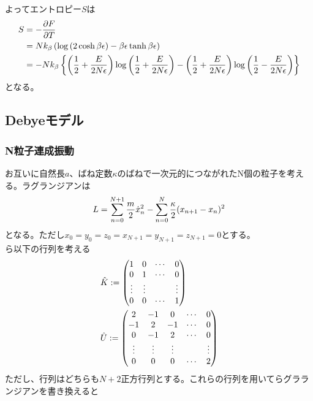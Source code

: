 \documentclass{jsarticle}  %
\numberwithin{equation}{section} %
\numberwithin{figure}{section}
\begin{document}
    よってエントロピー$S$は
    \begin{align}
        S &= -\frac{\partial F}{\partial T} \notag \\
        &= Nk_\beta \left( \log \left( 2\cosh \beta \epsilon \right) - \beta \epsilon \tanh \beta \epsilon \right) \\
        &= -Nk_\beta \left\{ \left( \frac{1}{2} + \frac{E}{2N\epsilon} \right) \log \left( \frac{1}{2} + \frac{E}{2N\epsilon} \right) - \left( \frac{1}{2} + \frac{E}{2N\epsilon} \right) \log \left( \frac{1}{2} - \frac{E}{2N\epsilon} \right) \right\} 
    \end{align}
    となる。
\subsection{Debyeモデル}
\subsubsection{N粒子連成振動}
    お互いに自然長$a$、ばね定数$\kappa$のばねで一次元的につながれたN個の粒子を考える。ラグランジアンは
    \begin{align}
        L = \sum_{n=0}^{N+1} \frac{m}{2}\dot{x}^2_n - \sum_{n=0}^{N} \frac{\kappa}{2}(x_{n+1} - x_n)^2 \notag 
    \end{align}
    となる。ただし$x_0 = y_0 = z_0 = x_{N+1} =  y_{N+1} = z_{N+1} = 0$とする。\\
    ら以下の行列を考える
    \begin{align}
        &\hat{K} := \left(
        \begin{matrix}
            1&0&\cdots&0\\
            0&1&\cdots&0\\
            \vdots&\vdots&&\vdots\\
            0&0&\cdots&1
        \end{matrix}
        \right)\notag \\
        &\hat{U} := \left( 
        \begin{matrix}
            2&-1&0&\cdots&0\\
            -1&2&-1&\cdots&0\\
            0&-1&2&\cdots&0\\
            \vdots&\vdots&\vdots&&\vdots\\
            0&0&0&\cdots&2
        \end{matrix}
        \right) \notag 
    \end{align}
    ただし、行列はどちらも$N+2$正方行列とする。これらの行列を用いてらグラランジアンを書き換えると
\end{document}
